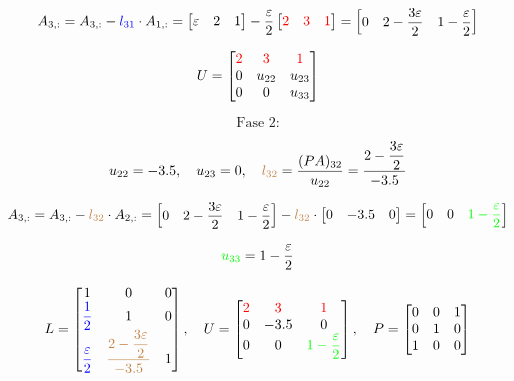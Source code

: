 \documentclass[12pt,a4paper]{article}
\begin{document}
\[
A_{3,:} = A_{3,:} - \textcolor{blue}{l_{31}} \cdot A_{1,:} =
\begin{bmatrix}
\varepsilon & 2 & 1
\end{bmatrix}
-
\dfrac{\varepsilon}{2}
\begin{bmatrix}
\textcolor{red}{2} & \textcolor{red}{3} & \textcolor{red}{1}
\end{bmatrix}
=
\begin{bmatrix}
0 & 2 - \dfrac{3\varepsilon}{2} & 1 - \dfrac{\varepsilon}{2}
\end{bmatrix}
\]

\[
U =
\begin{bmatrix}
\textcolor{red}{2} & \textcolor{red}{3} & \textcolor{red}{1} \\
0 & u_{22} & u_{23} \\
0 & 0 & u_{33}
\end{bmatrix}
\]

\[
\text{Fase 2:}
\]

\[
u_{22} = -3.5,\quad u_{23} = 0,\quad \textcolor{brown}{l_{32}} = \dfrac{(PA)_{32}}{u_{22}} = \dfrac{2 - \dfrac{3\varepsilon}{2}}{-3.5}
\]

\[
A_{3,:} = A_{3,:} - \textcolor{brown}{l_{32}} \cdot A_{2,:} =
\begin{bmatrix}
0 & 2 - \dfrac{3\varepsilon}{2} & 1 - \dfrac{\varepsilon}{2}
\end{bmatrix}
-
\textcolor{brown}{l_{32}} \cdot
\begin{bmatrix}
0 & -3.5 & 0
\end{bmatrix}
=
\begin{bmatrix}
0 & 0 & \textcolor{green}{1 - \dfrac{\varepsilon}{2}}
\end{bmatrix}
\]

\[
\textcolor{green}{u_{33}} = 1 - \dfrac{\varepsilon}{2}
\]

\[
L =
\begin{bmatrix}
1 & 0 & 0 \\
\textcolor{blue}{\dfrac{1}{2}} & 1 & 0 \\
\textcolor{blue}{\dfrac{\varepsilon}{2}} & \textcolor{brown}{\dfrac{2 - \dfrac{3\varepsilon}{2}}{-3.5}} & 1
\end{bmatrix},\quad
U =
\begin{bmatrix}
\textcolor{red}{2} & \textcolor{red}{3} & \textcolor{red}{1} \\
0 & -3.5 & 0 \\
0 & 0 & \textcolor{green}{1 - \dfrac{\varepsilon}{2}}
\end{bmatrix},\quad
P =
\begin{bmatrix}
0 & 0 & 1 \\
0 & 1 & 0 \\
1 & 0 & 0
\end{bmatrix}
\]
\end{document}
